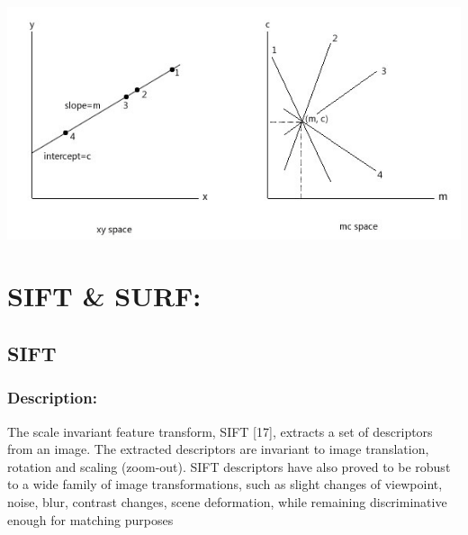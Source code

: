 \begin{itemize}
\begin{center}
\includegraphics[width=\textwidth]{xy-mc-example.png}
\end{center}
\end{itemize}
\section{SIFT \& SURF:}
\subsection{SIFT}
\subsubsection{Description:}
The scale invariant feature transform, SIFT [17], extracts a set of descriptors from an image. The
extracted descriptors are invariant to image translation, rotation and scaling (zoom-out). SIFT
descriptors have also proved to be robust to a wide family of image transformations, such as slight
changes of viewpoint, noise, blur, contrast changes, scene deformation, while remaining discriminative
enough for matching purposes
